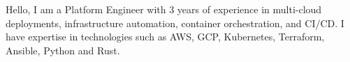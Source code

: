 \documentclass[10pt]{developercv} %
\begin{document}
\vspace{0.5cm}



\hspace{6pt}\begin{minipage}[t]{0.98\textwidth} %
	\vspace{-\baselineskip} %

	{Hello, I am a Platform Engineer with 3 years of experience in multi-cloud deployments, infrastructure automation, container orchestration, and CI/CD. I have expertise in technologies such as AWS, GCP, Kubernetes, Terraform, Ansible, Python and Rust.} %

\end{minipage}
\hfill %


%


\end{document}
